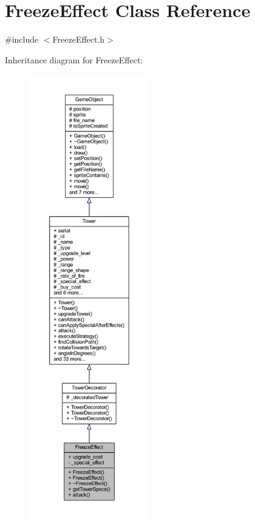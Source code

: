 \hypertarget{class_freeze_effect}{\section{Freeze\+Effect Class Reference}
\label{class_freeze_effect}
}


{\ttfamily \#include $<$Freeze\+Effect.\+h$>$}



Inheritance diagram for Freeze\+Effect\+:
\nopagebreak
\begin{figure}[H]
\begin{center}
\leavevmode
\includegraphics[height=550pt]{class_freeze_effect__inherit__graph}
\end{center}
\end{figure}


